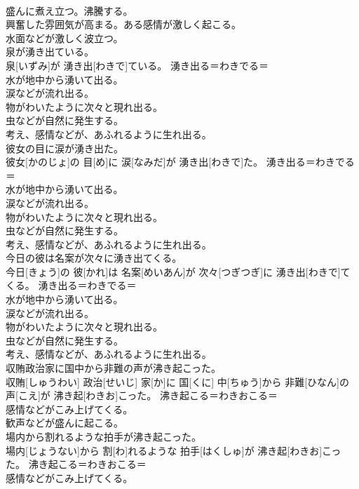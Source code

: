 \documentclass[8pt]{extreport}
\begin{document}
\begin{CJK}{UTF8}{min}
{\\	盛んに煮え立つ。沸騰する。 
\\	興奮した雰囲気が高まる。ある感情が激しく起こる。 
\\	水面などが激しく波立つ。
\\	泉が湧き出ている。	
\\	泉[いずみ]が 湧き出[わきで]ている。	湧き出る＝わきでる＝ 
\\	水が地中から湧いて出る。 
\\	涙などが流れ出る。 
\\	物がわいたように次々と現れ出る。 
\\	虫などが自然に発生する。 
\\	考え、感情などが、あふれるように生れ出る。
\\	彼女の目に涙が湧き出た。	
\\	彼女[かのじょ]の 目[め]に 涙[なみだ]が 湧き出[わきで]た。	湧き出る＝わきでる＝ 
\\	水が地中から湧いて出る。 
\\	涙などが流れ出る。 
\\	物がわいたように次々と現れ出る。 
\\	虫などが自然に発生する。 
\\	考え、感情などが、あふれるように生れ出る。
\\	今日の彼は名案が次々に湧き出てくる。	
\\	今日[きょう]の 彼[かれ]は 名案[めいあん]が 次々[つぎつぎ]に 湧き出[わきで]てくる。	湧き出る＝わきでる＝ 
\\	水が地中から湧いて出る。 
\\	涙などが流れ出る。 
\\	物がわいたように次々と現れ出る。 
\\	虫などが自然に発生する。 
\\	考え、感情などが、あふれるように生れ出る。
\\	収賄政治家に国中から非難の声が沸き起こった。	
\\	収賄[しゅうわい] 政治[せいじ] 家[か]に 国[くに] 中[ちゅう]から 非難[ひなん]の 声[こえ]が 沸き起[わきお]こった。	沸き起こる＝わきおこる＝ 
\\	感情などがこみ上げてくる。 
\\	歓声などが盛んに起こる。
\\	場内から割れるような拍手が沸き起こった。	
\\	場内[じょうない]から 割[わ]れるような 拍手[はくしゅ]が 沸き起[わきお]こった。	沸き起こる＝わきおこる＝ 
\\	感情などがこみ上げてくる。 
}
\end{CJK}
\end{document}
